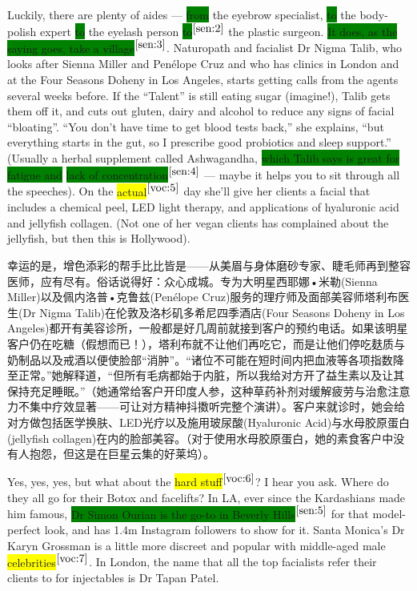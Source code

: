 \documentclass[UTF8]{ctexart}
\begin{document}
Luckily, there are plenty of aides — \colorbox{green}{from} the eyebrow specialist, \colorbox{green}{to} the body-polish expert \colorbox{green}{to} the eyelash person \colorbox{green}{to}$^{\ref{sen:2}}$ the plastic surgeon. \colorbox{green}{It does, as the saying goes, take a village}$^{\ref{sen:3}}$. Naturopath and facialist Dr Nigma Talib, who looks after Sienna Miller and Penélope Cruz and who has clinics in London and at the Four Seasons Doheny in Los Angeles, starts getting calls from the agents several weeks before. If the “Talent” is still eating sugar (imagine!), Talib gets them off it, and cuts out gluten, dairy and alcohol to reduce any signs of facial “bloating”. “You don’t have time to get blood tests back,” she explains, “but everything starts in the gut, so I prescribe good probiotics and sleep support.” (Usually a herbal supplement called Ashwagandha, \colorbox{green}{which Talib says is great for fatigue and} \colorbox{green}{lack of concentration}$^{\ref{sen:4}}$ — maybe it helps you to sit through all the speeches). On the \colorbox{yellow}{actual}$^{\ref{voc:5}}$ day she’ll give her clients a facial that includes a chemical peel, LED light therapy, and applications of hyaluronic acid and jellyfish collagen. (Not one of her vegan clients has complained about the jellyfish, but then this is Hollywood).

幸运的是，增色添彩的帮手比比皆是——从美眉与身体磨砂专家、睫毛师再到整容医师，应有尽有。俗话说得好：众心成城。专为大明星西耶娜•米勒(Sienna Miller)以及佩内洛普•克鲁兹(Penélope Cruz)服务的理疗师及面部美容师塔利布医生(Dr Nigma Talib)在伦敦及洛杉矶多希尼四季酒店(Four Seasons Doheny in Los Angeles)都开有美容诊所，一般都是好几周前就接到客户的预约电话。如果该明星客户仍在吃糖（假想而已！），塔利布就不让他们再吃它，而是让他们停吃麸质与奶制品以及戒酒以便使脸部“消肿”。“诸位不可能在短时间内把血液等各项指数降至正常。”她解释道，“但所有毛病都始于内脏，所以我给对方开了益生素以及让其保持充足睡眠。”（她通常给客户开印度人参，这种草药补剂对缓解疲劳与治愈注意力不集中疗效显著——可让对方精神抖擞听完整个演讲）。客户来就诊时，她会给对方做包括医学换肤、LED光疗以及施用玻尿酸(Hyaluronic Acid)与水母胶原蛋白(jellyfish collagen)在内的脸部美容。（对于使用水母胶原蛋白，她的素食客户中没有人抱怨，但这是在巨星云集的好莱坞）。

Yes, yes, yes, but what about the \colorbox{yellow}{hard stuff}$^{\ref{voc:6}}$? I hear you ask. Where do they all go for their Botox and facelifts? In LA, ever since the Kardashians made him famous, \colorbox{green}{Dr Simon Ourian is the go-to in Beverly Hills}$^{\ref{sen:5}}$ for that model-perfect look, and has 1.4m Instagram followers to show for it. Santa Monica’s Dr Karyn Grossman is a little more discreet and popular with middle-aged male \colorbox{yellow}{celebrities}$^{\ref{voc:7}}$. In London, the name that all the top facialists refer their clients to for injectables is Dr Tapan Patel.
\end{document}
